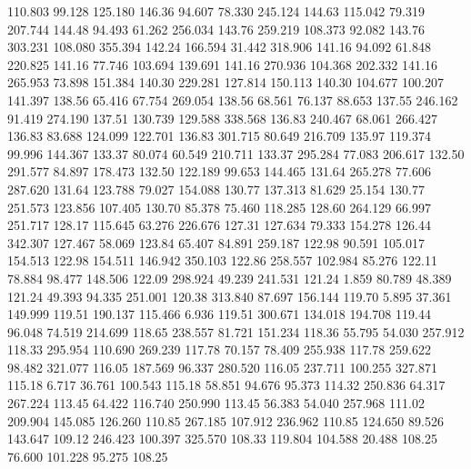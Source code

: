  110.803   99.128  125.180       146.36
  94.607   78.330  245.124       144.63
 115.042   79.319  207.744       144.48
  94.493   61.262  256.034       143.76
 259.219  108.373   92.082       143.76
 303.231  108.080  355.394       142.24
 166.594   31.442  318.906       141.16
  94.092   61.848  220.825       141.16
  77.746  103.694  139.691       141.16
 270.936  104.368  202.332       141.16
 265.953   73.898  151.384       140.30
 229.281  127.814  150.113       140.30
 104.677  100.207  141.397       138.56
  65.416   67.754  269.054       138.56
  68.561   76.137   88.653       137.55
 246.162   91.419  274.190       137.51
 130.739  129.588  338.568       136.83
 240.467   68.061  266.427       136.83
  83.688  124.099  122.701       136.83
 301.715   80.649  216.709       135.97
 119.374   99.996  144.367       133.37
  80.074   60.549  210.711       133.37
 295.284   77.083  206.617       132.50
 291.577   84.897  178.473       132.50
 122.189   99.653  144.465       131.64
 265.278   77.606  287.620       131.64
 123.788   79.027  154.088       130.77
 137.313   81.629   25.154       130.77
 251.573  123.856  107.405       130.70
  85.378   75.460  118.285       128.60
 264.129   66.997  251.717       128.17
 115.645   63.276  226.676       127.31
 127.634   79.333  154.278       126.44
 342.307  127.467   58.069       123.84
  65.407   84.891  259.187       122.98
  90.591  105.017  154.513       122.98
 154.511  146.942  350.103       122.86
 258.557  102.984   85.276       122.11
  78.884   98.477  148.506       122.09
 298.924   49.239  241.531       121.24
   1.859   80.789   48.389       121.24
  49.393   94.335  251.001       120.38
 313.840   87.697  156.144       119.70
   5.895   37.361  149.999       119.51
 190.137  115.466    6.936       119.51
 300.671  134.018  194.708       119.44
  96.048   74.519  214.699       118.65
 238.557   81.721  151.234       118.36
  55.795   54.030  257.912       118.33
 295.954  110.690  269.239       117.78
  70.157   78.409  255.938       117.78
 259.622   98.482  321.077       116.05
 187.569   96.337  280.520       116.05
 237.711  100.255  327.871       115.18
   6.717   36.761  100.543       115.18
  58.851   94.676   95.373       114.32
 250.836   64.317  267.224       113.45
  64.422  116.740  250.990       113.45
  56.383   54.040  257.968       111.02
 209.904  145.085  126.260       110.85
 267.185  107.912  236.962       110.85
 124.650   89.526  143.647       109.12
 246.423  100.397  325.570       108.33
 119.804  104.588   20.488       108.25
  76.600  101.228   95.275       108.25
